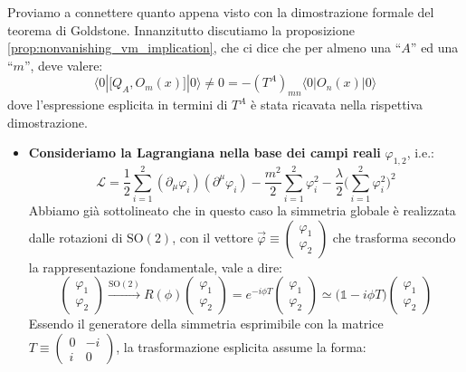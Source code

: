 \documentclass[../main.tex]{subfiles}
\begin{document}
\begin{exercise}
    Proviamo a connettere quanto appena visto con la dimostrazione formale del teorema di Goldstone.
    Innanzitutto discutiamo la proposizione \ref{prop:nonvanishing_vm_implication}, che ci dice che per almeno una “$A$” ed una “$m$”, deve valere:
    \begin{equation}
        \langle 0|\big[Q_A, O_m(x)\big]|0\rangle \neq 0 = -(T^A)_{mn}\langle 0|O_n(x)|0\rangle
        \label{eq:commutator_VEV}
    \end{equation}
    dove l'espressione esplicita in termini di $T^A$ è stata ricavata nella rispettiva dimostrazione.

    \begin{itemize}
    \item \textbf{Consideriamo la Lagrangiana nella base dei campi reali} $\varphi_{1,2}$, i.e.:
    \[
    \mathscr{L} = \frac{1}{2}\sum_{i=1}^2(\partial_\mu\varphi_i)(\partial^\mu\varphi_i) - \frac{m^2}{2}\sum_{i=1}^2\varphi_i^2 - \frac{\lambda}{2}\bigg(\sum_{i=1}^2\varphi_i^2\bigg)^2
    \]
    Abbiamo già sottolineato che in questo caso la simmetria globale è realizzata dalle rotazioni di $\textrm{SO}(2)$, con il vettore $\Vec{\varphi} \equiv \begin{pmatrix}\varphi_1\\ \varphi_2\end{pmatrix}$ che trasforma secondo la rappresentazione fondamentale, vale a dire:
    \[
    \begin{pmatrix}
    \varphi_1\\ 
    \varphi_2
    \end{pmatrix} \xrightarrow{\textrm{SO}(2)}
    R(\phi)\begin{pmatrix}
    \varphi_1\\ 
    \varphi_2
    \end{pmatrix} =
    e^{-i\phi T} \begin{pmatrix}
    \varphi_1\\ 
    \varphi_2
    \end{pmatrix}\simeq \big(\mathbb 1 - i\phi T\big)\begin{pmatrix}
    \varphi_1\\ 
    \varphi_2
    \end{pmatrix}
    \]
    Essendo il generatore della simmetria esprimibile con la matrice $T \equiv \begin{pmatrix}
    0&-i\\ 
    i&0
    \end{pmatrix}$, la trasformazione esplicita assume la forma:

\end{itemize}
\end{exercise}
\end{document}
